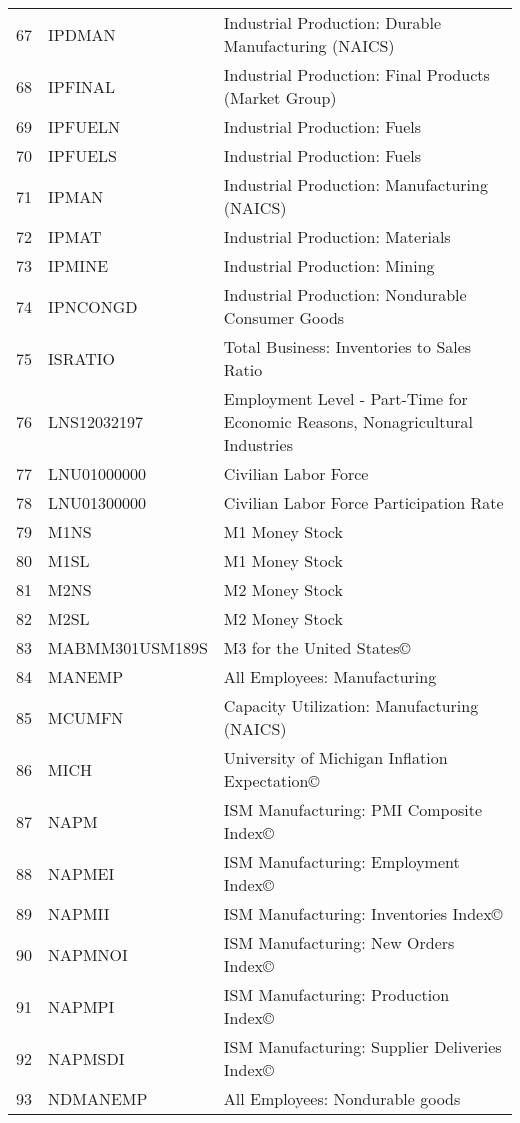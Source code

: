 \begin{table}[ht]
\begin{tabular}{rll}
  67 & IPDMAN & Industrial Production: Durable Manufacturing (NAICS) \\ 
  68 & IPFINAL & Industrial Production: Final Products (Market Group) \\ 
  69 & IPFUELN & Industrial Production: Fuels \\ 
  70 & IPFUELS & Industrial Production: Fuels \\ 
  71 & IPMAN & Industrial Production: Manufacturing (NAICS) \\ 
  72 & IPMAT & Industrial Production: Materials \\ 
  73 & IPMINE & Industrial Production: Mining \\ 
  74 & IPNCONGD & Industrial Production: Nondurable Consumer Goods \\ 
  75 & ISRATIO & Total Business: Inventories to Sales Ratio \\ 
  76 & LNS12032197 & Employment Level - Part-Time for Economic Reasons, Nonagricultural Industries \\ 
  77 & LNU01000000 & Civilian Labor Force \\ 
  78 & LNU01300000 & Civilian Labor Force Participation Rate \\ 
  79 & M1NS & M1 Money Stock \\ 
  80 & M1SL & M1 Money Stock \\ 
  81 & M2NS & M2 Money Stock \\ 
  82 & M2SL & M2 Money Stock \\ 
  83 & MABMM301USM189S & M3 for the United States© \\ 
  84 & MANEMP & All Employees: Manufacturing \\ 
  85 & MCUMFN & Capacity Utilization: Manufacturing (NAICS) \\ 
  86 & MICH & University of Michigan Inflation Expectation© \\ 
  87 & NAPM & ISM Manufacturing: PMI Composite Index© \\ 
  88 & NAPMEI & ISM Manufacturing: Employment Index© \\ 
  89 & NAPMII & ISM Manufacturing: Inventories Index© \\ 
  90 & NAPMNOI & ISM Manufacturing: New Orders Index© \\ 
  91 & NAPMPI & ISM Manufacturing: Production Index© \\ 
  92 & NAPMSDI & ISM Manufacturing: Supplier Deliveries Index© \\ 
  93 & NDMANEMP & All Employees: Nondurable goods \\ 

\end{tabular}
\end{table}
